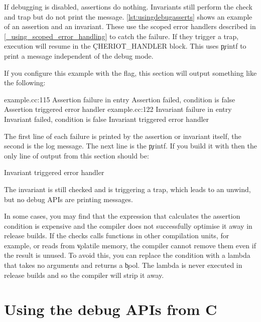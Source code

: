{If debugging is disabled, assertions do nothing.
Invariants still perform the check and trap but do not print the message.
\ref{lst:usingdebugasserts} shows an example of an assertion and an invariant.
These use the scoped error handlers described in \ref{_using_scoped_error_handling} to catch the failure.
If they trigger a trap, execution will resume in the \c{CHERIOT_HANDLER} block.
This uses \c{printf} to print a message independent of the debug mode.

\codelisting[filename=examples/debug_helpers/example.cc,marker=asserts,label=lst:usingdebugasserts,caption="Assertions and invariants with the debugging APIs."]{}

If you configure this example with the  flag, this section will output something like the following:

\begin{console}
example.cc:115 Assertion failure in entry
Assertion failed, condition is false
Assertion triggered error handler
example.cc:122 Invariant failure in entry
Invariant failed, condition is false
Invariant triggered error handler
\end{console}

The first line of each failure is printed by the assertion or invariant itself, the second is the log message.
The next line is the \c{printf}.
If you build it with  then the only line of output from this section should be:

\begin{console}
Invariant triggered error handler
\end{console}

The invariant is still checked and is triggering a trap, which leads to an unwind, but no debug APIs are printing messages.

In some cases, you may find that the expression that calculates the assertion condition is expensive and the compiler does not successfully optimise it away in release builds.
If the checks calls functions in other compilation units, for example, or reads from \c{volatile} memory, the compiler cannot remove them even if the result is unused.
To avoid this, you can replace the condition with a lambda that takes no arguments and returns a \c{bool}.
The lambda is never executed in release builds and so the compiler will strip it away.

\section{Using the debug APIs from C}

}
